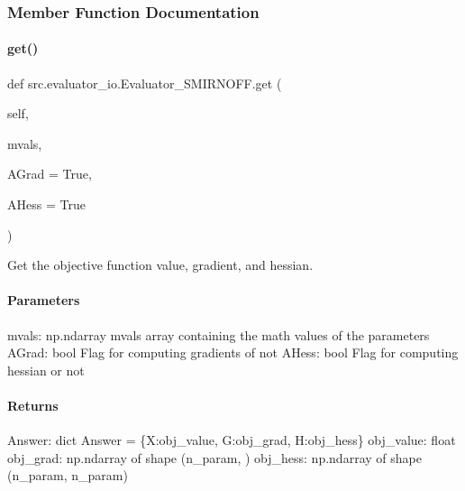 \subsubsection{Member Function Documentation}
\mbox{\label{classsrc_1_1evaluator__io_1_1Evaluator__SMIRNOFF_a609eeee4162c7b26fa40ff0df3eff104}} 
\paragraph{\texorpdfstring{get()}{get()}}
{\footnotesize\ttfamily def src.\+evaluator\+\_\+io.\+Evaluator\+\_\+\+S\+M\+I\+R\+N\+O\+F\+F.\+get (\begin{DoxyParamCaption}\item[{}]{self,  }\item[{}]{mvals,  }\item[{}]{A\+Grad = {\ttfamily True},  }\item[{}]{A\+Hess = {\ttfamily True} }\end{DoxyParamCaption})}



Get the objective function value, gradient, and hessian. 

\paragraph*{Parameters }

mvals\+: np.\+ndarray mvals array containing the math values of the parameters A\+Grad\+: bool Flag for computing gradients of not A\+Hess\+: bool Flag for computing hessian or not

\paragraph*{Returns }

Answer\+: dict Answer = \{\textquotesingle{}X\textquotesingle{}\+:obj\+\_\+value, \textquotesingle{}G\textquotesingle{}\+:obj\+\_\+grad, \textquotesingle{}H\textquotesingle{}\+:obj\+\_\+hess\} obj\+\_\+value\+: float obj\+\_\+grad\+: np.\+ndarray of shape (n\+\_\+param, ) obj\+\_\+hess\+: np.\+ndarray of shape (n\+\_\+param, n\+\_\+param)

